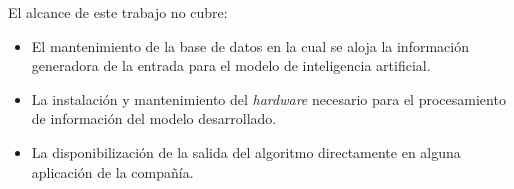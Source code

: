 El alcance de este trabajo no cubre:
\begin {itemize}
\item El mantenimiento de la base de datos en la cual se aloja la información generadora de la entrada para el modelo de inteligencia artificial.
\item La instalación y mantenimiento del \textit{hardware} necesario para el procesamiento de información del modelo desarrollado.
\item La disponibilización de la salida del algoritmo directamente en alguna aplicación de la compañía.
\end {itemize}
